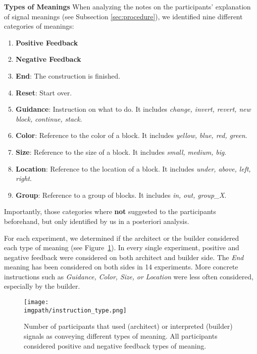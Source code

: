 \textbf{Types of Meanings} 
When analyzing the notes on the participants' explanation of signal meanings (see Subsection \ref{sec:procedure}), we identified nine different categories of meanings:
\begin{enumerate}
    \item \textbf{Positive Feedback}
    \item \textbf{Negative Feedback}
    \item \textbf{End}: The construction is finished.
    \item \textbf{Reset}: Start over.
    \item \textbf{Guidance}: Instruction on what to do. It includes \emph{change, invert, revert, new block, continue, stack}. 
    \item \textbf{Color}: Reference to the color of a block. It includes \emph{yellow, blue, red, green}.
    \item \textbf{Size}: Reference to the size of a block. It includes \emph{small, medium, big}.
    \item \textbf{Location}: Reference to the location of a block. It includes \emph{under, above, left, right}.
    \item \textbf{Group}: Reference to a group of blocks. It includes \emph{in, out, group\_X}.
\end{enumerate}
Importantly, those categories where \textbf{not} suggested to the participants beforehand, but only identified by us in a posteriori analysis.

For each experiment, we determined if the architect or the builder considered each type of meaning (see Figure~\ref{fig:types_of_feedback}). In every single experiment, positive and negative feedback were considered on both architect and builder side. The \emph{End} meaning has been considered on both sides in 14 experiments. More concrete instructions such as \emph{Guidance, Color, Size, or Location} were less often considered, especially by the builder.

\begin{figure}[!ht]
  \begin{center}
      \texttt{[image: \\imgpath/instruction\_type.png]}
      \caption{Number of participants that used (architect) or interpreted (builder) signals as conveying different types of meaning. All participants considered positive and negative feedback types of meaning.}
    \label{fig:types_of_feedback}
  \end{center}
\end{figure}

